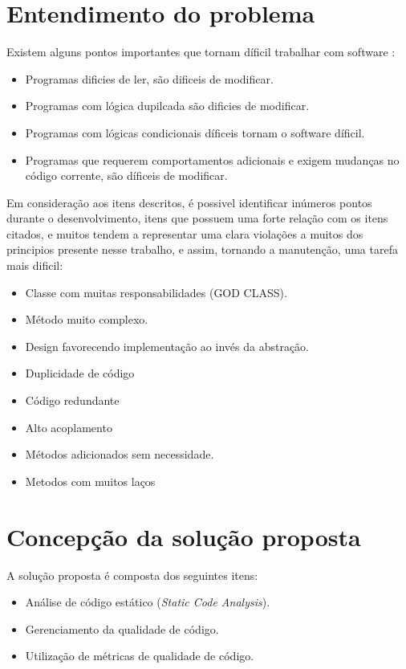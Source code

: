 \documentclass[12pt]{article}
\begin{document}
\part{Entendimento do problema} \label{sec:problema}

Existem alguns pontos importantes que tornam díficil trabalhar com software \cite{MARTIN_FOWLER_REFACTORING}:

\begin{itemize}
 \item Programas dificies de ler, são dificeis de modificar.
 \item Programas com lógica dupilcada são dificies de modificar.
 \item Programas com lógicas condicionais díficeis tornam o software díficil.
 \item Programas que requerem comportamentos adicionais e exigem mudanças no código corrente, são díficeis de modificar.
\end{itemize} 

Em consideração aos itens descritos, é possivel identificar inúmeros pontos durante o desenvolvimento, itens que possuem uma forte relação com os itens citados, e muitos tendem a representar uma clara violações a muitos dos principios presente nesse trabalho, e assim, tornando a manutenção, uma tarefa mais dificil:

\begin{itemize}
 \item Classe com muitas responsabilidades (GOD CLASS).
 \item Método muito complexo.
 \item Design favorecendo implementação ao invés da abstração.
 \item Duplicidade de código
 \item Código redundante
 \item Alto acoplamento
 \item Métodos adicionados sem necessidade.
 \item Metodos com muitos laços 
\end{itemize} 
	
\part{Concepção da solução proposta} \label{sec:concepcao}

A solução proposta é composta dos seguintes itens:

\begin{itemize}
 \item Análise de código estático (\textit{Static Code Analysis}).
 \item Gerenciamento da qualidade de código.
 \item Utilização de métricas de qualidade de código.
\end{itemize} 
\end{document}
